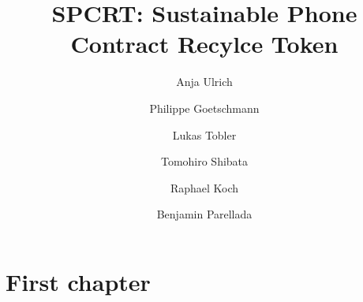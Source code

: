 \documentclass{scrartcl}
\title{SPCRT: Sustainable Phone Contract Recylce Token}
\author{%
    Anja Ulrich
    \and
    Philippe Goetschmann
    \and
    Lukas Tobler
    \and
    Tomohiro Shibata
    \and
    Raphael Koch
    \and
    Benjamin Parellada
}
\begin{document}
\maketitle

\section{First chapter}
\end{document}
